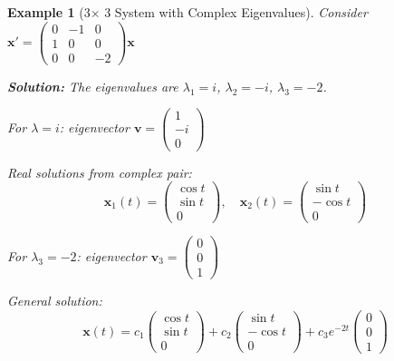 \documentclass[12pt]{article}
\newtheorem{example}{Example}
\begin{document}
\begin{example}[3$\times$ 3 System with Complex Eigenvalues]
Consider $\mathbf{x}' = \begin{pmatrix} 0 & -1 & 0 \\ 1 & 0 & 0 \\ 0 & 0 & -2 \end{pmatrix}\mathbf{x}$

\textbf{Solution:}
The eigenvalues are $\lambda_{1} = i$, $\lambda_{2} = -i$, $\lambda_{3} = -2$.

For $\lambda = i$: eigenvector $\mathbf{v} = \begin{pmatrix} 1 \\ -i \\ 0 \end{pmatrix}$

Real solutions from complex pair:
\[\mathbf{x}_{1}(t) = \begin{pmatrix} \cos t \\ \sin t \\ 0 \end{pmatrix}, \quad \mathbf{x}_{2}(t) = \begin{pmatrix} \sin t \\ -\cos t \\ 0 \end{pmatrix}\]

For $\lambda_{3} = -2$: eigenvector $\mathbf{v}_{3} = \begin{pmatrix} 0 \\ 0 \\ 1 \end{pmatrix}$

General solution:
\[\mathbf{x}(t) = c_{1}\begin{pmatrix} \cos t \\ \sin t \\ 0 \end{pmatrix} + c_{2}\begin{pmatrix} \sin t \\ -\cos t \\ 0 \end{pmatrix} + c_{3}e^{-2t}\begin{pmatrix} 0 \\ 0 \\ 1 \end{pmatrix}\]
\end{example}
\end{document}
